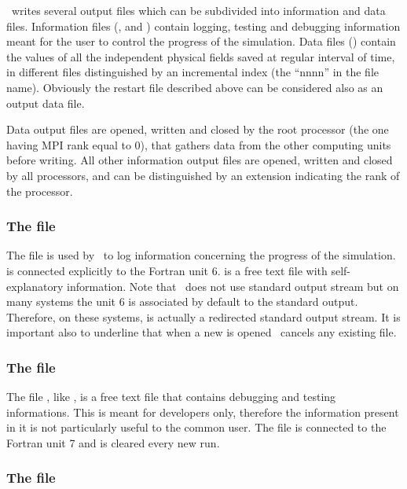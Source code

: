 \PDAC\ writes several output files which can be subdivided into 
information and data files. 
Information files (,  and
 ) contain logging, testing and debugging information
meant for the user to control the progress of the simulation.
Data files () contain the values of all the 
independent physical fields saved at regular interval of time, in different 
files distinguished by an incremental index (the ``nnnn'' in the file name).
Obviously the restart file described above can be considered also as an 
output data file.

Data output files are opened,
written and closed by the root processor (the one having MPI rank equal to 0), 
that gathers data from the other computing units before writing.
All other information output files 
are opened, written and closed by all processors, and can be distinguished
by an extension indicating the rank of the processor. 

\subsubsection{The  file}
\label{section:padc_log}

The file  is used by \PDAC\ to log information
concerning the progress of the simulation.  is 
connected explicitly to the Fortran unit 6. 
 is a free text file with self-explanatory information.
Note that \PDAC\ does not use standard output stream but on many
systems the unit 6 is associated by default to the standard output. Therefore,
on these systems,  is actually a redirected standard output stream.
It is important also to underline that when a new  is opened 
\PDAC\ cancels any existing  file.

\subsubsection{The  file}
\label{section:padc_tst}

The file , like , is a free text file that contains debugging
and testing informations. This is meant for developers only,
therefore the information present in it is not particularly useful to the common user.
The file is connected to the Fortran unit 7 and is cleared every new run.

\subsubsection{The  file}
\label{section:padc_err}

